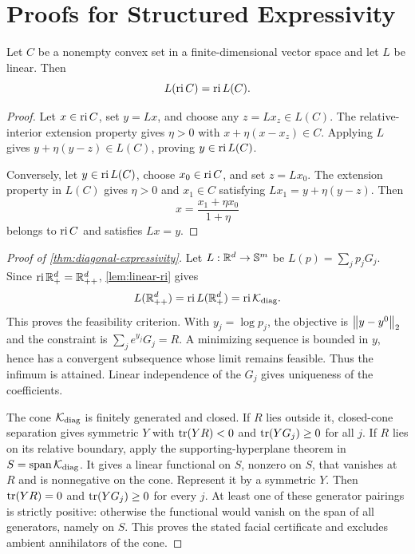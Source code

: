 \section{Proofs for Structured Expressivity}
\label{app:expressivity-proofs}

\begin{lemma}
\label{lem:linear-ri}
Let \(C\) be a nonempty convex set in a finite-dimensional vector space and
let \(L\) be linear.  Then
\begin{equation}
  L(\operatorname{ri} C)=\operatorname{ri} L(C).
  \label{eq:linear-ri}
\end{equation}
\end{lemma}

\begin{proof}
Let \(x\in\operatorname{ri} C\), set \(y=Lx\), and choose any \(z=Lx_z\in L(C)\).
The relative-interior extension property gives \(\eta>0\) with
\(x+\eta(x-x_z)\in C\).  Applying \(L\) gives
\(y+\eta(y-z)\in L(C)\), proving \(y\in\operatorname{ri} L(C)\).

Conversely, let \(y\in\operatorname{ri} L(C)\), choose \(x_0\in\operatorname{ri} C\), and set
\(z=Lx_0\).  The extension property in \(L(C)\) gives \(\eta>0\) and
\(x_1\in C\) satisfying \(Lx_1=y+\eta(y-z)\).  Then
\[
  x=\frac{x_1+\eta x_0}{1+\eta}
\]
belongs to \(\operatorname{ri} C\) and satisfies \(Lx=y\).
\end{proof}

\begin{proof}[Proof of \cref{thm:diagonal-expressivity}]
Let \(L:\mathbb R^d\to\mathbb S^m\) be \(L(p)=\sum_jp_jG_j\).  Since
\(\operatorname{ri}\mathbb R_+^d=\mathbb R_{++}^d\), \cref{lem:linear-ri} gives
\[
  L(\mathbb R_{++}^d)=\operatorname{ri} L(\mathbb R_+^d)=\operatorname{ri}\mathcal K_{\mathrm{diag}}.
\]
This proves the feasibility criterion.  With \(y_j=\log p_j\), the objective
is \(\left\lVert y-y^0\right\rVert_2\) and the constraint is
\(\sum_je^{y_j}G_j=R\).  A minimizing sequence is bounded in \(y\), hence
has a convergent subsequence whose limit remains feasible.  Thus the infimum
is attained.  Linear independence of the \(G_j\) gives uniqueness of the
coefficients.

The cone \(\mathcal K_{\mathrm{diag}}\) is finitely generated and closed.  If
\(R\) lies outside it, closed-cone separation gives symmetric \(Y\) with
\(\operatorname{tr}(YR)<0\) and \(\operatorname{tr}(YG_j)\ge0\) for all \(j\).  If \(R\) lies on its
relative boundary, apply the supporting-hyperplane theorem in
\(S=\operatorname{span}\mathcal K_{\mathrm{diag}}\).  It gives a linear
functional on \(S\), nonzero on \(S\), that vanishes at \(R\) and is
nonnegative on the cone.  Represent it by a symmetric \(Y\).  Then
\(\operatorname{tr}(YR)=0\) and \(\operatorname{tr}(YG_j)\ge0\) for every \(j\).  At least one of these
generator pairings is strictly positive: otherwise the functional would
vanish on the span of all generators, namely on \(S\).  This proves the
stated facial certificate and excludes ambient annihilators of the cone.
\end{proof}

